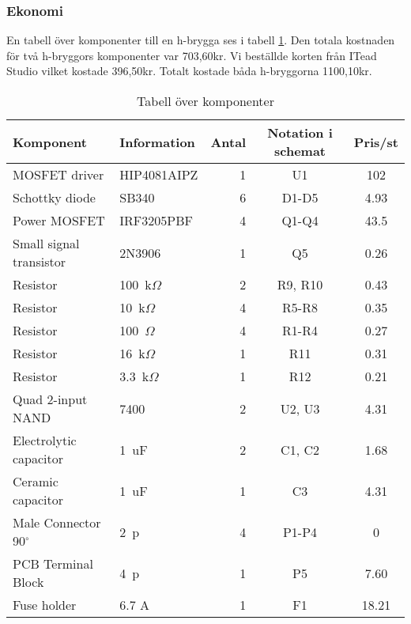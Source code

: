 \subsubsection{Ekonomi}
En tabell över komponenter till en h-brygga ses i tabell \ref{tbl:BOM}. Den totala kostnaden för två h-bryggors komponenter var 703,60kr. Vi beställde korten från ITead Studio vilket kostade 396,50kr. Totalt kostade båda h-bryggorna 1100,10kr.

\begin{table}[htb]
\centering
\caption{Tabell över komponenter}
\label{tbl:BOM}
\begin{tabular}{|l|l|r|c|c|}
\hline
\textbf{Komponent} & \textbf{Information} & \textbf{Antal} &
\textbf{Notation i schemat} & \textbf{Pris/st} \\
\hline
MOSFET driver & HIP4081AIPZ & 1 & U1 & 102 \\
\hline
Schottky diode & SB340 & 6 & D1-D5 & 4.93\\
\hline
Power MOSFET & IRF3205PBF & 4 & Q1-Q4 & 43.5\\
\hline
Small signal transistor & 2N3906 & 1 & Q5 & 0.26\\
\hline
Resistor & 100~k$\Omega$ & 2 & R9, R10 & 0.43\\
\hline
Resistor & 10~k$\Omega$ & 4 & R5-R8 & 0.35\\
\hline
Resistor & 100~$\Omega$ & 4 & R1-R4 & 0.27\\
\hline
Resistor & 16~k$\Omega$ & 1 & R11 & 0.31\\
\hline
Resistor & 3.3~k$\Omega$ & 1 & R12 & 0.21\\
\hline
Quad 2-input NAND & 7400 & 2 & U2, U3 & 4.31\\
\hline
Electrolytic capacitor & 1~uF & 2 & C1, C2 & 1.68\\
\hline
Ceramic capacitor & 1~uF & 1 & C3 & 4.31\\
\hline
Male Connector 90$^{\circ}$ & 2~p & 4 & P1-P4 & 0\\
\hline
PCB Terminal Block &  4~p & 1 & P5 & 7.60\\
\hline
Fuse holder & 6.7 A & 1 & F1 & 18.21\\
\hline
\end{tabular}	
\end{table}